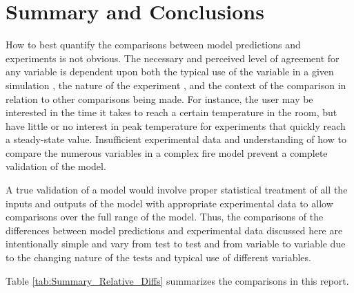 \chapter{Summary and Conclusions}

How to best quantify the comparisons between model predictions and experiments is not obvious. The necessary and perceived level of agreement for any variable is dependent upon both the typical use of the variable in a given simulation , the nature of the experiment , and the context of the comparison in relation to other comparisons being made. For instance, the user may be interested in the time it takes to reach a certain temperature in the room, but have little or no interest in peak temperature for experiments that quickly reach a steady-state value. Insufficient experimental data and understanding of how to compare the numerous variables in a complex fire model prevent a complete validation of the model. 

A true validation of a model would involve proper statistical treatment of all the inputs and outputs of the model with appropriate experimental data to allow comparisons over the full range of the model. Thus, the comparisons of the differences between model predictions and experimental data discussed here are intentionally simple and vary from test to test and from variable to variable due to the changing nature of the tests and typical use of different variables.

Table \ref{tab:Summary_Relative_Diffs} summarizes the comparisons in this report.

